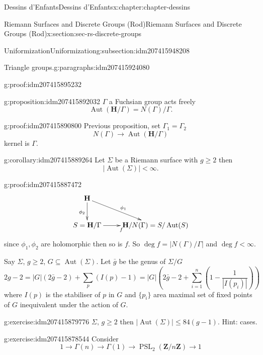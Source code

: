 \documentclass[oneside,10pt,]{book}
\numberwithin{equation}{section}
\newcommand{\ZZ}{\mathbf{Z}}
\newcommand{\HH}{\mathbf{H}}
\DeclareMathOperator{\Aut}{Aut}
\DeclareMathOperator{\PSL}{PSL}
\newcommand{\lt}{<}
\begin{document}
\begin{chapterptx}{Dessins d'Enfants}{}{Dessins d'Enfants}{}{}{x:chapter:chapter-dessins}
\begin{sectionptx}{Riemann Surfaces and Discrete Groups (Rod)}{}{Riemann Surfaces and Discrete Groups (Rod)}{}{}{x:section:sec-rs-discrete-groups}
\begin{subsectionptx}{Uniformization}{}{Uniformization}{}{}{g:subsection:idm207415948208}
\begin{paragraphs}{Triangle groups.}{g:paragraphs:idm207415924080}
\begin{proofptx}{}{g:proof:idm207415895232}
\end{proofptx}
\begin{proposition}{}{}{g:proposition:idm207415892032}%
\(\Gamma\) a Fuchsian group acts freely%
\begin{equation*}
\Aut(\HH/\Gamma) = N(\Gamma)/\Gamma\text{.}
\end{equation*}
%
\end{proposition}
\begin{proofptx}{}{g:proof:idm207415890800}
Previous proposition, set \(\Gamma_1 = \Gamma_2\)%
\begin{equation*}
N(\Gamma) \to \Aut(\HH/\Gamma)
\end{equation*}
kernel is \(\Gamma\).%
\end{proofptx}
\begin{corollary}{}{}{g:corollary:idm207415889264}%
Let \(\Sigma\) be a Riemann surface with \(g \ge 2\) then%
\begin{equation*}
|\Aut(\Sigma)| \lt \infty\text{.}
\end{equation*}
%
\end{corollary}
\begin{proofptx}{}{g:proof:idm207415887472}
%
\begin{equation*}
\xymatrix{
\HH \ar[dr]^{\phi_1} \ar[d]_{\phi_2}\\
S =\HH/\Gamma \ar[r]_f & \HH/N(\Gamma) = S/\Aut(S)
}
\end{equation*}
since \(\phi_1,\phi_2\) are holomorphic then so is \(f\). So \(\deg f=  | N(\Gamma) /\Gamma|\) and \(\deg f  \lt \infty\).%
\end{proofptx}
Say \(\Sigma\), \(g\ge 2\), \(G\subseteq \Aut(\Sigma)\). Let \(\bar g\) be the genus of \(\Sigma /G\)%
\begin{equation*}
2g - 2 = |G| (2\bar g - 2) + \sum_p (I(p) - 1) = |G|(2\bar g - 2 + \sum_{i=1}^n (1 - \frac{1}{|I(p_i)|}))
\end{equation*}
where \(I(p)\) is the stabiliser of \(p\) in \(G\) and \(\{p_i\}\) area maximal set of fixed points of \(G\) inequivalent under the action of \(G\).%
\begin{inlineexercise}{}{g:exercise:idm207415879776}%
\(\Sigma,\,g\ge 2\) then \(|\Aut(\Sigma)| \le 84(g-1)\). Hint: cases.%
\end{inlineexercise}
\begin{inlineexercise}{}{g:exercise:idm207415878544}%
Consider%
\begin{equation*}
1 \to \Gamma(n) \to \Gamma(1) \to \PSL_2(\ZZ/n\ZZ) \to 1
\end{equation*}

\end{inlineexercise}
\end{paragraphs}
\end{subsectionptx}
\end{sectionptx}
\end{chapterptx}
\end{document}
